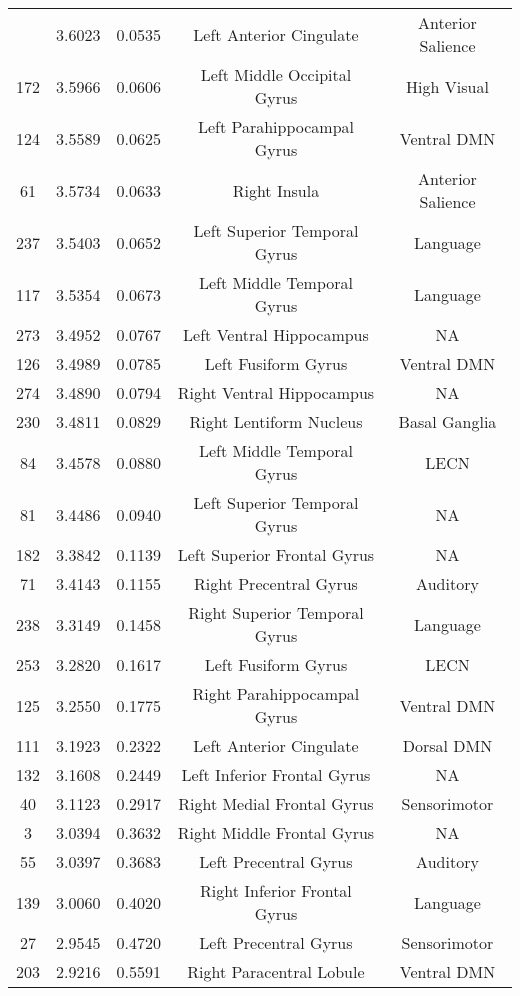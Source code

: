 \documentclass[12pt]{article}\usepackage[]{graphicx}\usepackage[]{color}
\begin{document}
\begin{longtable}[c]{ccccc}
	\bottomrule
	\endlastfoot
	212 & 3.6023 & 0.0535 & Left Anterior Cingulate & Anterior Salience \\
	172	& 3.5966 & 0.0606 & Left Middle Occipital Gyrus & High Visual \\
	124	& 3.5589 & 0.0625 & Left Parahippocampal Gyrus & Ventral DMN \\
	61	& 3.5734 & 0.0633 & Right Insula & Anterior Salience \\
	237	& 3.5403 & 0.0652 & Left Superior Temporal Gyrus & Language \\
	117	& 3.5354 & 0.0673 & Left Middle Temporal Gyrus & Language \\
	273	& 3.4952 & 0.0767 & Left Ventral Hippocampus & NA \\
	126	& 3.4989 & 0.0785 & Left Fusiform Gyrus & Ventral DMN \\
	274	& 3.4890 & 0.0794 & Right Ventral Hippocampus & NA \\
	230	& 3.4811 & 0.0829 & Right Lentiform Nucleus & Basal Ganglia \\
	84	& 3.4578 & 0.0880 & Left Middle Temporal Gyrus & LECN \\
	81	& 3.4486 & 0.0940 & Left Superior Temporal Gyrus & NA \\
	182	& 3.3842 & 0.1139 & Left Superior Frontal Gyrus & NA \\
	71	& 3.4143 & 0.1155 & Right Precentral Gyrus & Auditory \\
	238	& 3.3149 & 0.1458 & Right Superior Temporal Gyrus & Language \\
	253	& 3.2820 & 0.1617 & Left Fusiform Gyrus & LECN \\
	125	& 3.2550 & 0.1775 & Right Parahippocampal Gyrus & Ventral DMN \\
	111	& 3.1923 & 0.2322 & Left Anterior Cingulate & Dorsal DMN \\
	132	& 3.1608 & 0.2449 & Left Inferior Frontal Gyrus & NA \\
	40	& 3.1123 & 0.2917 & Right Medial Frontal Gyrus & Sensorimotor \\
	3	& 3.0394 & 0.3632 & Right Middle Frontal Gyrus & NA \\
	55	& 3.0397 & 0.3683 & Left Precentral Gyrus & Auditory \\
	139	& 3.0060 & 0.4020 & Right Inferior Frontal Gyrus & Language \\
	27	& 2.9545 & 0.4720 & Left Precentral Gyrus & Sensorimotor \\
	203	& 2.9216 & 0.5591 & Right Paracentral Lobule & Ventral DMN \\

\end{longtable}
\end{document}
